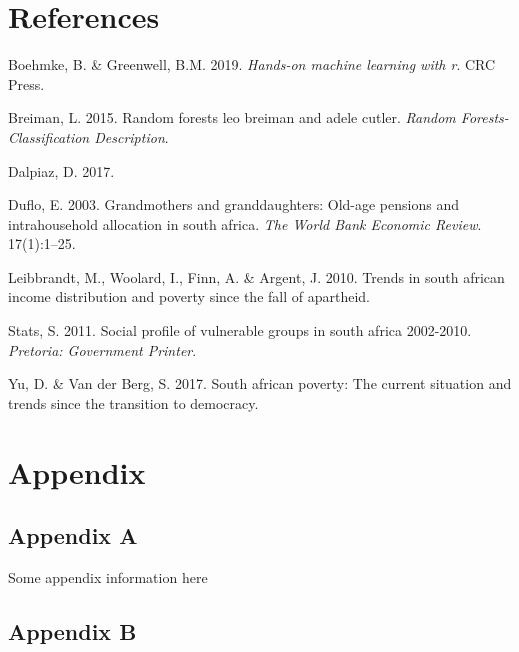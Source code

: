 \documentclass[11pt,preprint, authoryear]{elsarticle}
\numberwithin{equation}{section}
\numberwithin{figure}{section}
\numberwithin{table}{section}
\newlength{\cslhangindent}
\newenvironment{CSLReferences}%
  {\setlength{\parindent}{0pt}%
  \everypar{\setlength{\hangindent}{\cslhangindent}}\ignorespaces}%
  {\par}
\begin{document}
\newpage

\hypertarget{references}{%
\section*{References}\label{references}}

\hypertarget{refs}{}
\begin{CSLReferences}{1}{0}
\leavevmode\hypertarget{ref-boehmke2019hands}{}%
Boehmke, B. \& Greenwell, B.M. 2019. \emph{Hands-on machine learning
with r}. CRC Press.

\leavevmode\hypertarget{ref-breiman2015random}{}%
Breiman, L. 2015. Random forests leo breiman and adele cutler.
\emph{Random Forests-Classification Description}.

\leavevmode\hypertarget{ref-dalpiaz}{}%
Dalpiaz, D. 2017.

\leavevmode\hypertarget{ref-duflo2003}{}%
Duflo, E. 2003. Grandmothers and granddaughters: Old-age pensions and
intrahousehold allocation in south africa. \emph{The World Bank Economic
Review}. 17(1):1--25.

\leavevmode\hypertarget{ref-leibbrandt2010trends}{}%
Leibbrandt, M., Woolard, I., Finn, A. \& Argent, J. 2010. Trends in
south african income distribution and poverty since the fall of
apartheid.

\leavevmode\hypertarget{ref-stats2011social}{}%
Stats, S. 2011. Social profile of vulnerable groups in south africa
2002-2010. \emph{Pretoria: Government Printer}.

\leavevmode\hypertarget{ref-vanderberg2017}{}%
Yu, D. \& Van der Berg, S. 2017. South african poverty: The current
situation and trends since the transition to democracy.

\end{CSLReferences}

\hypertarget{appendix}{%
\section*{Appendix}\label{appendix}}

\hypertarget{appendix-a}{%
\subsection*{Appendix A}\label{appendix-a}}

Some appendix information here

\hypertarget{appendix-b}{%
\subsection*{Appendix B}\label{appendix-b}}


\end{document}
